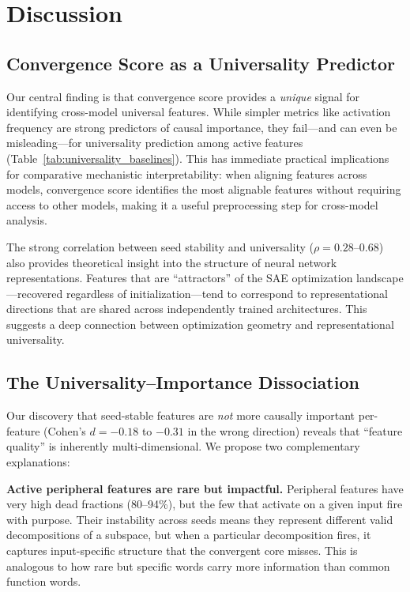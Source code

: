 \documentclass[final]{article}
\begin{document}
\section{Discussion}
\label{sec:discussion}

\subsection{Convergence Score as a Universality Predictor}

Our central finding is that convergence score provides a \emph{unique} signal for identifying cross-model universal features. While simpler metrics like activation frequency are strong predictors of causal importance, they fail---and can even be misleading---for universality prediction among active features (Table~\ref{tab:universality_baselines}). This has immediate practical implications for comparative mechanistic interpretability: when aligning features across models, convergence score identifies the most alignable features without requiring access to other models, making it a useful preprocessing step for cross-model analysis.

The strong correlation between seed stability and universality ($\rho = 0.28$--$0.68$) also provides theoretical insight into the structure of neural network representations. Features that are ``attractors'' of the SAE optimization landscape---recovered regardless of initialization---tend to correspond to representational directions that are shared across independently trained architectures. This suggests a deep connection between optimization geometry and representational universality.

\subsection{The Universality--Importance Dissociation}

Our discovery that seed-stable features are \emph{not} more causally important per-feature (Cohen's $d = -0.18$ to $-0.31$ in the wrong direction) reveals that ``feature quality'' is inherently multi-dimensional. We propose two complementary explanations:

\textbf{Active peripheral features are rare but impactful.} Peripheral features have very high dead fractions (80--94\%), but the few that activate on a given input fire with purpose. Their instability across seeds means they represent different valid decompositions of a subspace, but when a particular decomposition fires, it captures input-specific structure that the convergent core misses. This is analogous to how rare but specific words carry more information than common function words.
\end{document}
